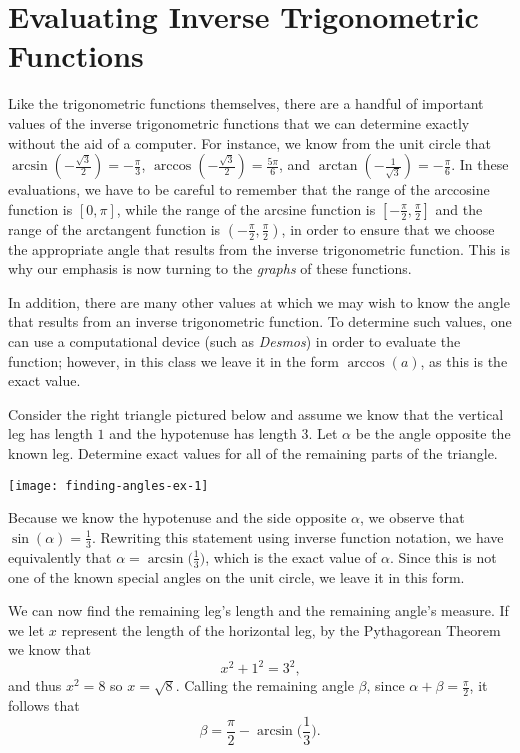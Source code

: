 \documentclass{ximera}
\begin{document}
\section{Evaluating Inverse Trigonometric Functions}
%
Like the trigonometric functions themselves, there are a handful of important values of the inverse trigonometric functions that we can determine exactly without the aid of a computer. For instance, we know from the unit circle that $\arcsin(-\frac{\sqrt{3}}{2}) = -\frac{\pi}{3}$, $\arccos(-\frac{\sqrt{3}}{2}) = \frac{5\pi}{6}$, and $\arctan(-\frac{1}{\sqrt{3}}) = -\frac{\pi}{6}$.  In these evaluations, we have to be careful to remember that the range of the arccosine function is $[0,\pi]$, while the range of the arcsine function is $[-\frac{\pi}{2},\frac{\pi}{2}]$ and the range of the arctangent function is $(-\frac{\pi}{2},\frac{\pi}{2})$, in order to ensure that we choose the appropriate angle that results from the inverse trigonometric function. This is why our emphasis is now turning to the {\it graphs} of these functions. 
%
\par
\hypertarget{p-1956}{}%
In addition, there are many other values at which we may wish to know the angle that results from an inverse trigonometric function. To determine such values, one can use a computational device (such as \emph{Desmos}) in order to evaluate the function; however, in this class we leave it in the form $\arccos(a)$, as this is the exact value.%
\begin{example}
%
Consider the right triangle pictured below and assume we know that the vertical leg has length $1$ and the hypotenuse has length $3$.  Let $\alpha$ be the angle opposite the known leg.  Determine exact values for all of the remaining parts of the triangle.%
%
\begin{image}
\texttt{[image: finding-angles-ex-1]}
\end{image}

\begin{explanation}
Because we know the hypotenuse and the side opposite $\alpha$, we observe that $\sin(\alpha) = \frac{1}{3}$.  Rewriting this statement using inverse function notation, we have equivalently that $\alpha = \arcsin\!\bigg(\frac{1}{3}\bigg)$, which is the exact value of $\alpha$.  Since this is not one of the known special angles on the unit circle, we leave it in this form.%
\par
%
We can now find the remaining leg's length and the remaining angle's measure.  If we let $x$ represent the length of the horizontal leg, by the Pythagorean Theorem we know that
%
\begin{equation*}
x^2 + 1^2 = 3^2\text{,}
\end{equation*}
and thus $x^2 = 8$ so $x = \sqrt{8}$.  Calling the remaining angle $\beta$, since $\alpha + \beta = \frac{\pi}{2}$, it follows that
%
\begin{equation*}
\beta = \frac{\pi}{2} - \arcsin\!\bigg(\frac{1}{3}\bigg) \text{.}
\end{equation*}

\end{explanation}
\end{example}
\end{document}
